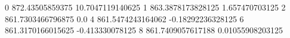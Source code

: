0 872.43505859375 10.7047119140625
1 863.3878173828125 1.657470703125
2 861.7303466796875 0.0
4 861.5474243164062 -0.18292236328125
6 861.3170166015625 -0.413330078125
8 861.7409057617188 0.01055908203125
